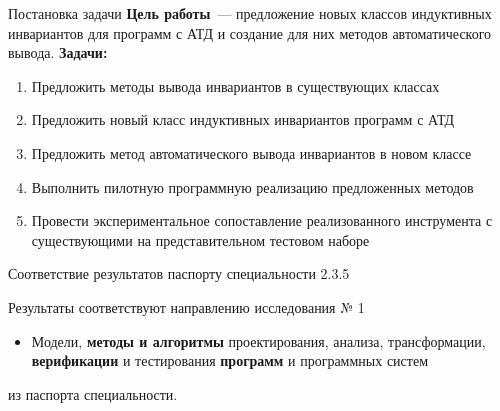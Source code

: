 \documentclass[22pt,aspectratio=169]{beamer}
\begin{document}
\togglefalse{fastCompile}



\begin{frame}[plain]
\titlepage
\end{frame}



\whenFullCompile{}


\begin{framesection}{Постановка задачи}
\textbf{Цель работы}~--- предложение новых классов индуктивных инвариантов для программ с АТД и создание для них методов автоматического вывода. \textbf{Задачи:}

\begin{enumerate}
\item Предложить методы вывода инвариантов в существующих классах
\item Предложить новый класс индуктивных инвариантов программ с АТД
\item Предложить метод автоматического вывода инвариантов в новом классе
\item Выполнить пилотную программную реализацию предложенных методов
\item Провести экспериментальное сопоставление реализованного инструмента с существующими на представительном тестовом наборе
\end{enumerate}
\end{framesection}







\begin{frame}{Соответствие результатов паспорту специальности 2.3.5}

Результаты соответствуют направлению исследования  № 1
\begin{itemize}
\item Модели, \textbf{методы и алгоритмы} проектирования, анализа, трансформации, \textbf{верификации} и тестирования \textbf{программ} и программных систем
\end{itemize}
из паспорта специальности.
\end{frame}
\end{document}
